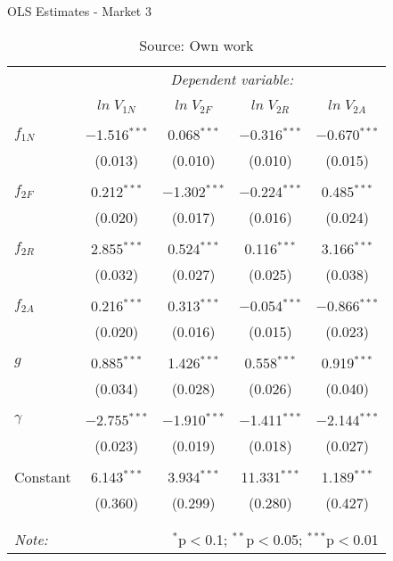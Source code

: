 
\begin{table}[!htbp] \centering 
  \caption{OLS Estimates - Market 3} 
  \label{} 
\begin{tabular}{@{\extracolsep{5pt}}lcccc} 
\toprule 
 & \multicolumn{4}{c}{\textit{Dependent variable:}} \\ 
\cline{2-5} 
\\[-1.8ex] & $ln \; V_{1N}$ & $ln \; V_{2F}$ & $ln \; V_{2R}$ & $ln \; V_{2A}$ \\ 
\hline \\[-1.8ex] 
$f_{1N}$ & $-$1.516$^{***}$ & 0.068$^{***}$ & $-$0.316$^{***}$ & $-$0.670$^{***}$ \\ 
  & (0.013) & (0.010) & (0.010) & (0.015) \\ 
  & & & & \\ 
 $f_{2F}$ & 0.212$^{***}$ & $-$1.302$^{***}$ & $-$0.224$^{***}$ & 0.485$^{***}$ \\ 
  & (0.020) & (0.017) & (0.016) & (0.024) \\ 
  & & & & \\ 
 $f_{2R}$ & 2.855$^{***}$ & 0.524$^{***}$ & 0.116$^{***}$ & 3.166$^{***}$ \\ 
  & (0.032) & (0.027) & (0.025) & (0.038) \\ 
  & & & & \\ 
 $f_{2A}$ & 0.216$^{***}$ & 0.313$^{***}$ & $-$0.054$^{***}$ & $-$0.866$^{***}$ \\ 
  & (0.020) & (0.016) & (0.015) & (0.023) \\ 
  & & & & \\ 
 $g$ & 0.885$^{***}$ & 1.426$^{***}$ & 0.558$^{***}$ & 0.919$^{***}$ \\ 
  & (0.034) & (0.028) & (0.026) & (0.040) \\ 
  & & & & \\ 
 $\gamma$ & $-$2.755$^{***}$ & $-$1.910$^{***}$ & $-$1.411$^{***}$ & $-$2.144$^{***}$ \\ 
  & (0.023) & (0.019) & (0.018) & (0.027) \\ 
  & & & & \\ 
 Constant & 6.143$^{***}$ & 3.934$^{***}$ & 11.331$^{***}$ & 1.189$^{***}$ \\ 
  & (0.360) & (0.299) & (0.280) & (0.427) \\ 
  & & & & \\  
\hline 
\hline \\[-1.8ex] 
\textit{Note:}  & & \multicolumn{3}{r}{$^{*}$p$<$0.1; $^{**}$p$<$0.05; $^{***}$p$<$0.01} \\ 
\bottomrule 
\end{tabular}
\caption*{Source: Own work} 
\end{table} 
